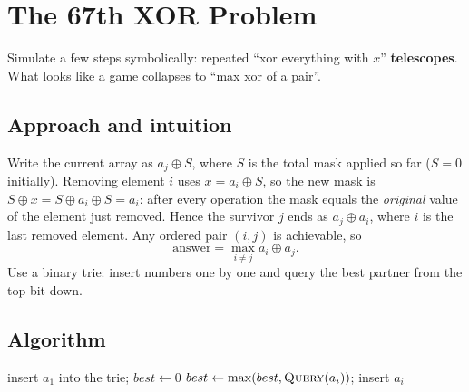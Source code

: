 \section{The 67th XOR Problem}
\label{sec:b-67th}


\begin{patternbox}
Simulate a few steps symbolically: repeated ``xor everything with $x$''
\textbf{telescopes}. What looks like a game collapses to ``max xor of a
pair''.
\end{patternbox}

\subsection*{Approach and intuition}

Write the current array as $a_j\oplus S$, where $S$ is the total mask applied
so far ($S=0$ initially). Removing element $i$ uses $x=a_i\oplus S$, so the new
mask is $S\oplus x=S\oplus a_i\oplus S=a_i$: after every operation the mask
equals the \emph{original} value of the element just removed. Hence the
survivor $j$ ends as $a_j\oplus a_i$, where $i$ is the last removed element.
Any ordered pair $(i,j)$ is achievable, so
\[
  \text{answer}=\max_{i\ne j} a_i\oplus a_j .
\]
Use a binary trie: insert numbers one by one and query the best partner from
the top bit down.

\subsection*{Algorithm}
\begin{algorithmic}[1]
\State insert $a_1$ into the trie; $best\gets0$
 \State $best\gets\max(best,\textsc{Query}(a_i))$; insert $a_i$ \EndFor
\end{algorithmic}



